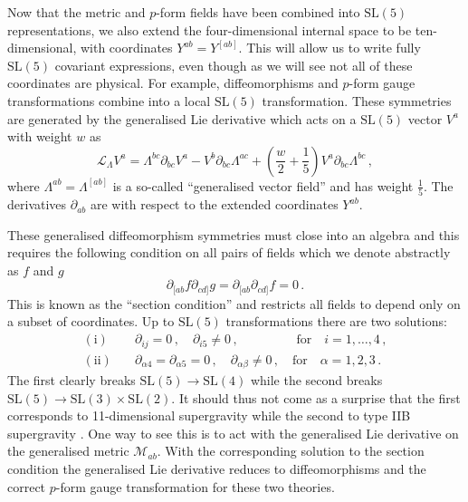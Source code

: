 \documentclass{PoS}
\newcommand{\SL}[1]{\mathrm{SL}( #1 )}
\newcommand{\gL}{\mathcal{L}}
\newcommand{\gM}{\mathcal{M}}
\begin{document}
Now that the metric and $p$-form fields have been combined into $\SL{5}$ representations, we also extend the four-dimensional internal space to be ten-dimensional, with coordinates $Y^{ab} = Y^{[ab]}$. This will allow us to write fully $\SL{5}$ covariant expressions, even though as we will see not all of these coordinates are physical. For example, diffeomorphisms and $p$-form gauge transformations combine into a local $\SL{5}$ transformation. These symmetries are generated by the generalised Lie derivative \cite{Berman:2011cg,Coimbra:2012af,Berman:2012vc} which acts on a $\SL{5}$ vector $V^a$ with weight $w$ as
\begin{equation}
 \gL_\Lambda V^a = \Lambda^{bc} \partial_{bc} V^a - V^b \partial_{bc} \Lambda^{ac} + \left( \frac{w}{2} + \frac15 \right) V^a \partial_{bc} \Lambda^{bc} \,, \label{eq:gL}
\end{equation}
where $\Lambda^{ab} = \Lambda^{[ab]}$ is a so-called ``generalised vector field'' and has weight $\frac15$. The derivatives $\partial_{ab}$ are with respect to the extended coordinates $Y^{ab}$.

These generalised diffeomorphism symmetries must close into an algebra and this requires the following condition on all pairs of fields which we denote abstractly as $f$ and $g$
\begin{equation}
 \partial_{[ab} f \partial_{cd]} g = \partial_{[ab} \partial_{cd]} f = 0 \,.
\end{equation}
This is known as the ``section condition'' \cite{Berman:2011cg} and restricts all fields to depend only on a subset of coordinates. Up to $\SL{5}$ transformations there are two solutions:
\begin{equation}
 \begin{split}
  \mathrm{(i)} &\quad \partial_{ij} = 0 \,, \quad \partial_{i5} \neq 0 \,, \qquad \qquad ~\,\, \textrm{for} \quad i = 1, \ldots, 4 \,, \\
  \mathrm{(ii)} &\quad \partial_{\alpha 4} = \partial_{\alpha 5} = 0 \,, \quad \partial_{\alpha \beta} \neq 0 \,, \quad \textrm{for} \quad \alpha = 1, 2, 3 \,.
 \end{split}
\end{equation}
The first clearly breaks $\SL{5} \longrightarrow \SL{4}$ while the second breaks $\SL{5} \longrightarrow \SL{3} \times \SL{2}$. It should thus not come as a surprise that the first corresponds to 11-dimensional supergravity while the second to type IIB supergravity \cite{Blair:2013gqa,Hohm:2013vpa}. One way to see this is to act with the generalised Lie derivative on the generalised metric $\gM_{ab}$. With the corresponding solution to the section condition the generalised Lie derivative reduces to diffeomorphisms and the correct $p$-form gauge transformation for these two theories.
\end{document}
